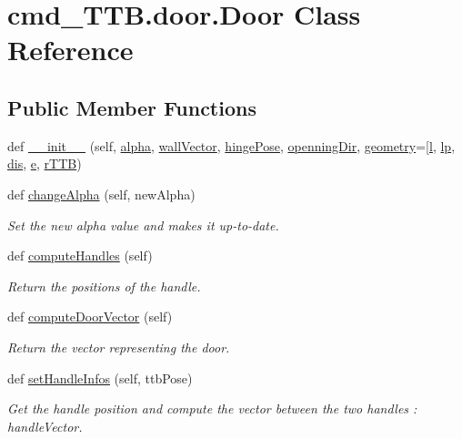 \hypertarget{classcmd__TTB_1_1door_1_1Door}{}\section{cmd\+\_\+\+T\+T\+B.\+door.\+Door Class Reference}
\label{classcmd__TTB_1_1door_1_1Door}
\subsection*{Public Member Functions}
\begin{DoxyCompactItemize}
\item 
def \hyperlink{classcmd__TTB_1_1door_1_1Door_aa56a9406385a9fb7d2b0a1d06a90d4da}{\+\_\+\+\_\+init\+\_\+\+\_\+} (self, \hyperlink{classcmd__TTB_1_1door_1_1Door_a43c4b1f6e9c6ae4187382dc263c58d02}{alpha}, \hyperlink{classcmd__TTB_1_1door_1_1Door_a067030e5b4755f2d2b4340588609901c}{wall\+Vector}, \hyperlink{classcmd__TTB_1_1door_1_1Door_a17ee5270094c8735cb4ae02968645fe2}{hinge\+Pose}, \hyperlink{classcmd__TTB_1_1door_1_1Door_ac11ebd7424dd4a074edcda4c0584e61d}{openning\+Dir}, \hyperlink{classcmd__TTB_1_1door_1_1Door_a212cc5247f91b1f69d35ae939c7ea34d}{geometry}=\mbox{[}\hyperlink{classcmd__TTB_1_1door_1_1Door_a82aed36f492d477c488cca0e31c91845}{l}, \hyperlink{classcmd__TTB_1_1door_1_1Door_a5366be26d44de1cad62c4aacb66718b1}{lp}, \hyperlink{classcmd__TTB_1_1door_1_1Door_aab6a2a8e488dad5304b7ee73e9ca65a9}{dis}, \hyperlink{classcmd__TTB_1_1door_1_1Door_a7802efbefd3ee0f39ad7da87db6bde66}{e}, \hyperlink{classcmd__TTB_1_1door_1_1Door_aeebd5ef44f3ec44c230c157e295b3414}{r\+T\+TB})
\item 
def \hyperlink{classcmd__TTB_1_1door_1_1Door_a813cada30a910799c7fc7722f25a015e}{change\+Alpha} (self, new\+Alpha)
\begin{DoxyCompactList}\small\item\em Set the new alpha value and makes it up-\/to-\/date. \end{DoxyCompactList}\item 
def \hyperlink{classcmd__TTB_1_1door_1_1Door_a78b3b6c52e6dc61fe481137d57d6b0c0}{compute\+Handles} (self)
\begin{DoxyCompactList}\small\item\em Return the positions of the handle. \end{DoxyCompactList}\item 
def \hyperlink{classcmd__TTB_1_1door_1_1Door_ac00b5e77ae2e82577bfd831248226fd2}{compute\+Door\+Vector} (self)
\begin{DoxyCompactList}\small\item\em Return the vector representing the door. \end{DoxyCompactList}\item 
def \hyperlink{classcmd__TTB_1_1door_1_1Door_a11ec42f1aae5d6e9216fb30f61b0f938}{set\+Handle\+Infos} (self, ttb\+Pose)
\begin{DoxyCompactList}\small\item\em Get the handle position and compute the vector between the two handles \+: handle\+Vector. \end{DoxyCompactList}\end{DoxyCompactItemize}
